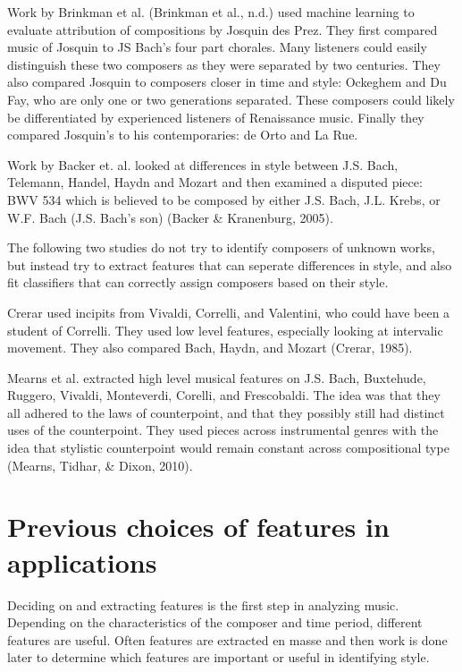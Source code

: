 \documentclass[12pt,twoside]{reedthesis}
\theoremstyle{definition}
\theoremstyle{definition}
\theoremstyle{definition}
\theoremstyle{remark}
\begin{document}
Work by Brinkman et al. (Brinkman et al., n.d.) used machine learning to
evaluate attribution of compositions by Josquin des Prez. They first
compared music of Josquin to JS Bach's four part chorales. Many
listeners could easily distinguish these two composers as they were
separated by two centuries. They also compared Josquin to composers
closer in time and style: Ockeghem and Du Fay, who are only one or two
generations separated. These composers could likely be differentiated by
experienced listeners of Renaissance music. Finally they compared
Josquin's to his contemporaries: de Orto and La Rue.

Work by Backer et. al. looked at differences in style between J.S. Bach,
Telemann, Handel, Haydn and Mozart and then examined a disputed piece:
BWV 534 which is believed to be composed by either J.S. Bach, J.L.
Krebs, or W.F. Bach (J.S. Bach's son) (Backer \& Kranenburg, 2005).

The following two studies do not try to identify composers of unknown
works, but instead try to extract features that can seperate differences
in style, and also fit classifiers that can correctly assign composers
based on their style.

Crerar used incipits from Vivaldi, Correlli, and Valentini, who could
have been a student of Correlli. They used low level features,
especially looking at intervalic movement. They also compared Bach,
Haydn, and Mozart (Crerar, 1985).

Mearns et al. extracted high level musical features on J.S. Bach,
Buxtehude, Ruggero, Vivaldi, Monteverdi, Corelli, and Frescobaldi. The
idea was that they all adhered to the laws of counterpoint, and that
they possibly still had distinct uses of the counterpoint. They used
pieces across instrumental genres with the idea that stylistic
counterpoint would remain constant across compositional type (Mearns,
Tidhar, \& Dixon, 2010).

\section{Previous choices of features in
applications}\label{previous-choices-of-features-in-applications}

Deciding on and extracting features is the first step in analyzing
music. Depending on the characteristics of the composer and time period,
different features are useful. Often features are extracted en masse and
then work is done later to determine which features are important or
useful in identifying style.
\end{document}
